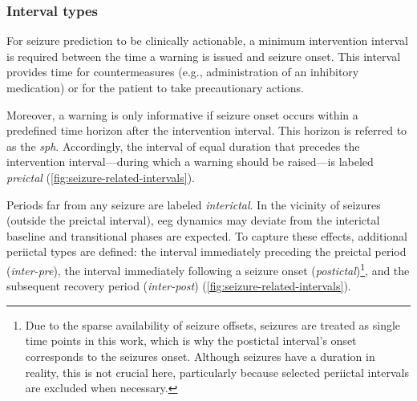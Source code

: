 \subsubsection{Interval types} \label{subsubsec:interval-types}
For seizure prediction to be clinically actionable, a minimum intervention interval is required between the time a warning is issued and seizure onset.
This interval provides time for countermeasures (e.g., administration of an inhibitory medication) or for the patient to take precautionary actions.

Moreover, a warning is only informative if seizure onset occurs within a predefined time horizon after the intervention interval.
This horizon is referred to as the \textit{\gls{sph}}.
Accordingly, the interval of equal duration that precedes the intervention interval---during which a warning should be raised---is labeled \textit{preictal} (\cref{fig:seizure-related-intervals}).

Periods far from any seizure are labeled \textit{interictal}.
In the vicinity of seizures (outside the preictal interval), \gls{eeg} dynamics may deviate from the interictal baseline and transitional phases are expected.
To capture these effects, additional periictal types are defined: the interval immediately preceding the preictal period (\textit{inter-pre}), the interval immediately following a seizure onset (\textit{postictal})\footnote{Due to the sparse availability of seizure offsets, seizures are treated as single time points in this work, which is why the postictal interval's onset corresponds to the seizures onset. Although seizures have a duration in reality, this is not crucial here, particularly because selected periictal intervals are excluded when necessary.}, and the subsequent recovery period (\textit{inter-post}) (\cref{fig:seizure-related-intervals}).

